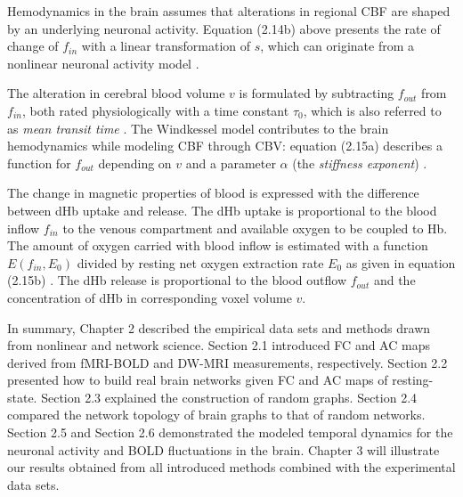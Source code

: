 Hemodynamics in the brain assumes that alterations in regional CBF are shaped by an underlying neuronal activity. Equation (2.14b) above presents the rate of change of $f_{in}$ with a linear transformation of $s$, which can originate from a nonlinear neuronal activity model \citep{XYZ00, XYZFR}. 

The alteration in cerebral blood volume $v$ is formulated by subtracting $f_{out}$ from $f_{in}$, both rated physiologically with a time constant $\tau_0$, which is also referred to as \textit{mean transit time} \citep{XYZ99}. The Windkessel model contributes to the brain hemodynamics while modeling CBF through CBV:  equation (2.15a) describes a function for $f_{out}$ depending on $v$ and a parameter $\alpha$ (the  \textit{stiffness exponent}) \citep{XYZ99}.    

The change in magnetic properties of blood is expressed with the difference between dHb uptake and release. The dHb uptake is proportional to the blood inflow $f_{in}$ to the venous compartment and available oxygen to be coupled to Hb. The amount of oxygen carried with blood inflow is estimated with a function $E(f_{in}, E_0)$ divided by resting net oxygen extraction rate $E_0$ as given in equation (2.15b) \citep{XYZ98}. The dHb release is proportional to the blood outflow $f_{out}$ and the concentration of dHb in corresponding voxel volume $v$.     

In summary, Chapter 2 described the empirical data sets and methods drawn from nonlinear and network science. Section 2.1 introduced FC and AC maps derived from fMRI-BOLD and DW-MRI measurements, respectively. Section 2.2 presented how to build real brain networks given FC and AC maps of resting-state. Section 2.3 explained the construction of random graphs. Section 2.4 compared the network topology of brain graphs to that of random networks. Section 2.5 and Section 2.6 demonstrated the modeled temporal dynamics for the neuronal activity and BOLD fluctuations in the brain. Chapter 3 will illustrate our results obtained from all introduced methods combined with the experimental data sets. 





 
